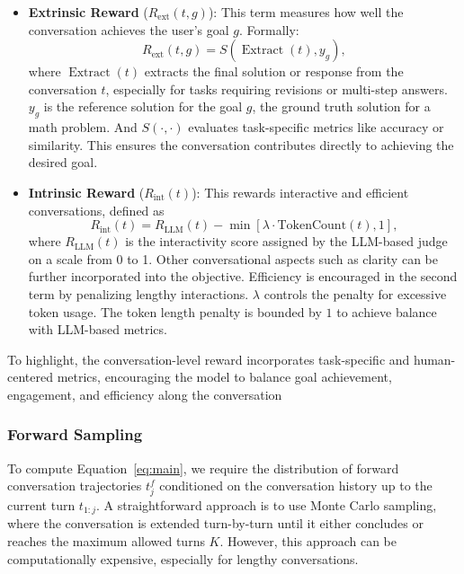 \begin{itemize}%
    \item \textbf{Extrinsic Reward} ($R_{\text{ext}}(t, g)$): This term measures how well the conversation achieves the user’s goal $g$. Formally:
    \begin{equation}
        R_{\text{ext}}(t, g) = S(\operatorname{Extract}(t), y_g),
    \end{equation}
    where $\operatorname{Extract}(t)$ extracts the final solution or response from the conversation $t$, especially for tasks requiring revisions or multi-step answers. $y_g$ is the reference solution for the goal $g$, \eg the ground truth solution for a math problem. And $S(\cdot, \cdot)$ evaluates task-specific metrics like accuracy or similarity. This ensures the conversation contributes directly to achieving the desired goal.

    \item \textbf{Intrinsic Reward} ($R_{\text{int}}(t)$): This rewards interactive and efficient conversations, defined as
    \begin{equation}
        R_{\text{int}}(t) = R_{\text{LLM}}(t) - \min[\lambda \cdot \text{TokenCount}(t), 1],
    \end{equation}
    where $R_{\text{LLM}}(t)$ is the interactivity score assigned by the LLM-based judge~\citep{llm_as_judge} on a scale from 0 to 1. 
    Other conversational aspects such as clarity can be further incorporated into the objective. 
    Efficiency is encouraged in the second term by penalizing lengthy interactions. 
    $\lambda$ controls the penalty for excessive token usage. The token length penalty is bounded by $1$ to achieve balance with LLM-based metrics. 
\end{itemize}

To highlight, the conversation-level reward incorporates task-specific and human-centered metrics, encouraging the model to balance goal achievement, engagement, and efficiency along the conversation

\subsubsection{Forward Sampling}

To compute Equation~\ref{eq:main}, we require the distribution of forward conversation trajectories $t_j^f$ conditioned on the conversation history up to the current turn $t_{1:j}$. A straightforward approach is to use Monte Carlo sampling, where the conversation is extended turn-by-turn until it either concludes or reaches the maximum allowed turns $K$. However, this approach can be computationally expensive, especially for lengthy conversations. 


